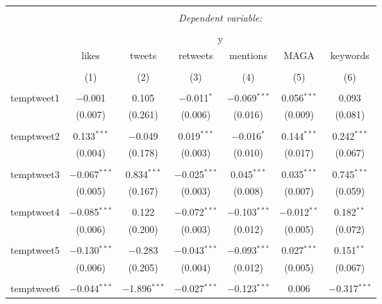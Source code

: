 
\begin{table}[!htbp] \centering 
  \caption{} 
  \label{} 
\begin{tabular}{@{\extracolsep{5pt}}lcccccc} 
\\[-1.8ex]\hline 
\hline \\[-1.8ex] 
 & \multicolumn{6}{c}{\textit{Dependent variable:}} \\ 
\cline{2-7} 
\\[-1.8ex] & \multicolumn{6}{c}{y} \\ 
 & likes & tweets & retweets & mentions & MAGA & keywords \\ 
\\[-1.8ex] & (1) & (2) & (3) & (4) & (5) & (6)\\ 
\hline \\[-1.8ex] 
 temptweet1 & $-$0.001 & 0.105 & $-$0.011$^{*}$ & $-$0.069$^{***}$ & 0.056$^{***}$ & 0.093 \\ 
  & (0.007) & (0.261) & (0.006) & (0.016) & (0.009) & (0.081) \\ 
  & & & & & & \\ 
 temptweet2 & 0.133$^{***}$ & $-$0.049 & 0.019$^{***}$ & $-$0.016$^{*}$ & 0.144$^{***}$ & 0.242$^{***}$ \\ 
  & (0.004) & (0.178) & (0.003) & (0.010) & (0.017) & (0.067) \\ 
  & & & & & & \\ 
 temptweet3 & $-$0.067$^{***}$ & 0.834$^{***}$ & $-$0.025$^{***}$ & 0.045$^{***}$ & 0.035$^{***}$ & 0.745$^{***}$ \\ 
  & (0.005) & (0.167) & (0.003) & (0.008) & (0.007) & (0.059) \\ 
  & & & & & & \\ 
 temptweet4 & $-$0.085$^{***}$ & 0.122 & $-$0.072$^{***}$ & $-$0.103$^{***}$ & $-$0.012$^{**}$ & 0.182$^{**}$ \\ 
  & (0.006) & (0.200) & (0.003) & (0.012) & (0.005) & (0.072) \\ 
  & & & & & & \\ 
 temptweet5 & $-$0.130$^{***}$ & $-$0.283 & $-$0.043$^{***}$ & $-$0.093$^{***}$ & 0.027$^{***}$ & 0.151$^{**}$ \\ 
  & (0.006) & (0.205) & (0.004) & (0.012) & (0.005) & (0.067) \\ 
  & & & & & & \\ 
 temptweet6 & $-$0.044$^{***}$ & $-$1.896$^{***}$ & $-$0.027$^{***}$ & $-$0.123$^{***}$ & 0.006 & $-$0.317$^{***}$ \\ 

\end{tabular}
\end{table}
